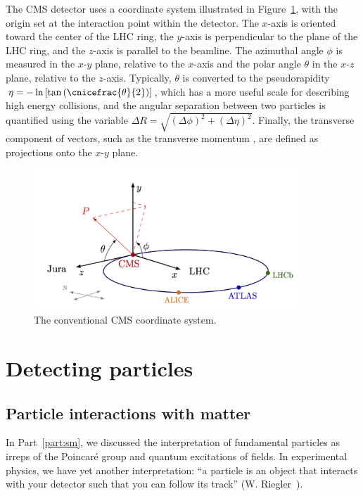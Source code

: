 The CMS detector uses a coordinate system illustrated in Figure~\ref{fig:02_cms_coords}, with the origin set at the interaction point within the detector. 
The $x$-axis is oriented toward the center of the LHC ring, the $y$-axis is perpendicular to the plane of the LHC ring, and the $z$-axis is parallel to the beamline.
The azimuthal angle $\phi$ is measured in the $x$-$y$ plane, relative to the $x$-axis and the polar angle $\theta$ in the $x$-$z$ plane, relative to the $z$-axis.
Typically, $\theta$ is converted to the pseudorapidity $\eta = -\ln \left[ \tan \left( \cnicefrac{\theta}{2} \right) \right]$, which has a more useful scale for describing high energy collisions, and the angular separation between two particles is quantified using the variable $\Delta R = \sqrt{ (\Delta \phi)^2 + (\Delta \eta)^2 }$.
Finally, the transverse component of vectors, such as the transverse momentum \pt, are defined as projections onto the $x$-$y$ plane.

\begin{figure}[ht]
    \centering
    \captionsetup{justification=centering}
    \includegraphics[width=0.9\textwidth]{figures/02-CMS/cms/coordinate.png}
    \caption{The conventional CMS coordinate system.}
    \label{fig:02_cms_coords}
\end{figure}

\section{Detecting particles}
\label{sec:02_cms_particles}

\subsection{Particle interactions with matter}
\label{sec:02_cms_interactions}

In Part~\ref{part:sm}, we discussed the interpretation of fundamental particles as irreps of the Poincar\'e group and quantum excitations of fields.
In experimental physics, we have yet another interpretation: ``a particle is an object that interacts with your detector such that you can follow its track'' (W. Riegler~\cite{Riegler2013}).

